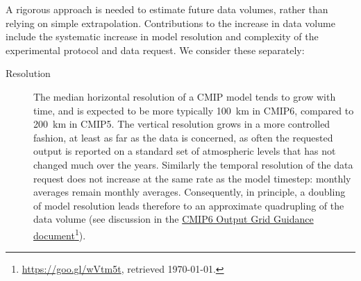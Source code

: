 \documentclass[gmd,manuscript]{copernicus}
\newcommand{\urlref}[2] {\href{#1}{#2}\footnote{\url{#1}, retrieved \today.}}
\begin{document}
A rigorous approach is needed to estimate future
data volumes, rather than relying on simple extrapolation. Contributions to
the increase in data volume include the systematic increase in model
resolution and complexity of the experimental protocol and data
request. We consider these separately:

\begin{description}
\item[Resolution] The median horizontal resolution of a CMIP model
  tends to grow with time, and is expected to be more typically 100~km
  in CMIP6, compared to 200~km in CMIP5. The vertical resolution grows
  in a more controlled fashion, at least as far as the data is
  concerned, as often the requested output is reported on a standard
  set of atmospheric levels that has not changed much over the years.
  Similarly the temporal resolution of the data request does not
  increase at the same rate as the model timestep: monthly averages
  remain monthly averages. Consequently, in principle, a doubling of model resolution leads
  therefore to an approximate quadrupling of the data volume
  (see discussion in the
  \urlref{https://goo.gl/wVtm5t}{CMIP6 Output Grid Guidance
    document}).  


\end{description}
\end{document}
